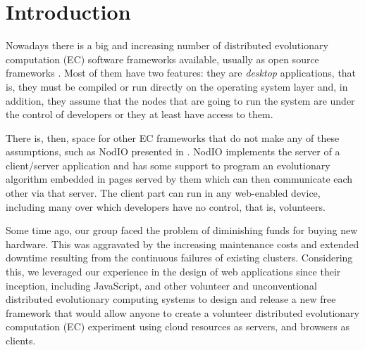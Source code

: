 \documentclass{sig-alternate}
\begin{document}


\section{Introduction}

Nowadays there is a big and increasing number of distributed
evolutionary computation (EC) software frameworks available, usually
as open source frameworks \cite{Parejo12Survey}.  Most of them have
two features: they are {\em desktop} applications, that is, they must
be compiled or run directly on the operating system layer and, in addition,
they assume that the nodes that are going to run the system are under
the control of developers or they at least have access to them.

There is, then, space for other EC frameworks that do not make any of
these assumptions, such as {\sf NodIO} presented in
\cite{2016arXiv160101607Manom}. {\sf NodIO} implements the server of a
client/server application and has some support to program an
evolutionary algorithm embedded in pages served by them which can then
communicate each other via that server. The client part can run in any
web-enabled device, including many over which developers have no
control, that is, volunteers.

Some time ago, our group faced the problem of diminishing funds for
buying new hardware. This was aggravated by the increasing maintenance costs and
extended downtime resulting from the continuous failures of existing
clusters.
Considering this, we leveraged our experience in the design of web
applications since their inception, including JavaScript, and other
volunteer and
unconventional distributed evolutionary computing systems to 
design and release a new free framework that would allow anyone to
create a volunteer distributed evolutionary computation (EC) experiment using cloud resources as
servers, and browsers as clients.
\end{document}

